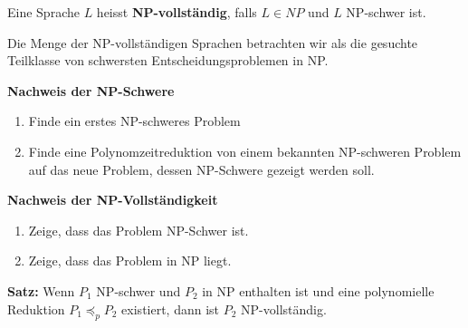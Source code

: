 Eine Sprache $L$ heisst \textbf{NP-vollständig}, falls $L \in NP$ und $L$ NP-schwer ist.

Die Menge der NP-vollständigen Sprachen betrachten wir als die gesuchte Teilklasse von schwersten Entscheidungsproblemen in NP.\

\textbf{Nachweis der NP-Schwere}
\begin{enumerate}
    \item Finde ein erstes NP-schweres Problem
    \item Finde eine Polynomzeitreduktion von einem bekannten NP-schweren Problem auf das neue Problem, dessen NP-Schwere gezeigt werden soll.
\end{enumerate}

\textbf{Nachweis der NP-Vollständigkeit}
\begin{enumerate}
    \item Zeige, dass das Problem NP-Schwer ist.
    \item Zeige, dass das Problem in NP liegt.
\end{enumerate}

\textbf{Satz:}
Wenn $P_1$ NP-schwer und $P_2$ in NP enthalten ist und eine polynomielle Reduktion $P_1 \preceq_p P_2$ existiert, dann ist $P_2$ NP-vollständig.

\vspace{-\baselineskip}
\hrulefill


